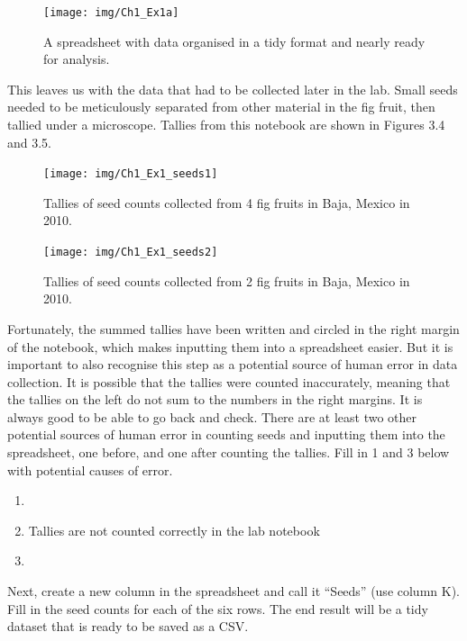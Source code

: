 \documentclass[
]{scrbook}
\providecommand{\tightlist}{%
  \setlength{\itemsep}{0pt}\setlength{\parskip}{0pt}}
\begin{document}
\begin{figure}
\texttt{[image: img/Ch1\_Ex1a]} \caption{A spreadsheet with data organised in a tidy format and nearly ready for analysis.}\label{fig:unnamed-chunk-13}
\end{figure}

This leaves us with the data that had to be collected later in the lab.
Small seeds needed to be meticulously separated from other material in the fig fruit, then tallied under a microscope. Tallies from this notebook are shown in Figures 3.4 and 3.5.

\begin{figure}
\texttt{[image: img/Ch1\_Ex1\_seeds1]} \caption{Tallies of seed counts collected from 4 fig fruits in Baja, Mexico in 2010.}\label{fig:unnamed-chunk-14}
\end{figure}

\begin{figure}
\texttt{[image: img/Ch1\_Ex1\_seeds2]} \caption{Tallies of seed counts collected from 2 fig fruits in Baja, Mexico in 2010.}\label{fig:unnamed-chunk-15}
\end{figure}

Fortunately, the summed tallies have been written and circled in the right margin of the notebook, which makes inputting them into a spreadsheet easier.
But it is important to also recognise this step as a potential source of human error in data collection.
It is possible that the tallies were counted inaccurately, meaning that the tallies on the left do not sum to the numbers in the right margins.
It is always good to be able to go back and check.
There are at least two other potential sources of human error in counting seeds and inputting them into the spreadsheet, one before, and one after counting the tallies.
Fill in 1 and 3 below with potential causes of error.

\begin{enumerate}
\def\labelenumi{\arabic{enumi}.}
\tightlist
\item
\item
  Tallies are not counted correctly in the lab notebook
\item
\end{enumerate}

Next, create a new column in the spreadsheet and call it ``Seeds'' (use column K).
Fill in the seed counts for each of the six rows.
The end result will be a tidy dataset that is ready to be saved as a CSV.
\end{document}
